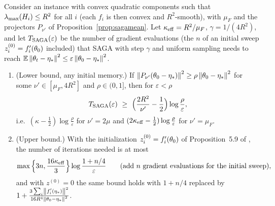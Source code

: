 \begin{corollary}
\label{cor:saga}
Consider an instance with convex quadratic components such that $\lambda_{\max}(H_i)\le R^2$ for all $i$ (each $f_i$ is then convex and $R^2$-smooth), with $\mu_F$ and the projectors $P_{\nu'}$ of Proposition~\ref{prop:sagamean}. Let $\kappa_{\rm eff}=R^2/\mu_F$, $\gamma=1/(4R^2)$, and let $T_{\rm SAGA}(\varepsilon)$ be the number of gradient evaluations (the $n$ of an initial sweep $z_i^{(0)}=f'_i(\theta_0)$ included) that SAGA with step $\gamma$ and uniform sampling needs to reach $\mathbb{E}\left\|\theta_t-\eta_\ast\right\|^2\le\varepsilon\left\|\theta_0-\eta_\ast\right\|^2$.
\begin{enumerate}[nosep,label=(\alph*)]
\item (Lower bound, any initial memory.) If $\left\|P_{\nu'}(\theta_0-\eta_\ast)\right\|^2\ge\rho\left\|\theta_0-\eta_\ast\right\|^2$ for some $\nu'\in[\mu_F,4R^2]$ and $\rho\in(0,1]$, then for $\varepsilon<\rho$
\[
T_{\rm SAGA}(\varepsilon)\ \ge\ \Big(\frac{2R^2}{\nu'}-\frac12\Big)\log\frac\rho\varepsilon ,
\]
i.e.\ $(\kappa-\frac12)\log\frac\rho\varepsilon$ for $\nu'=2\mu$ and $(2\kappa_{\rm eff}-\frac12)\log\frac\rho\varepsilon$ for $\nu'=\mu_F$.
\item (Upper bound.) With the initialization $z_i^{(0)}=f'_i(\theta_0)$ of Proposition~5.9 of \cite{bach2024learning}, the number of iterations needed is at most
\[
\max\Big\{3n,\frac{16\kappa_{\rm eff}}3\Big\}\log\frac{1+n/4}{\varepsilon}\qquad(\text{add $n$ gradient evaluations for the initial sweep}),
\]
and with $z^{(0)}=0$ the same bound holds with $1+n/4$ replaced by $1+\frac{3\sum_i\left\|f'_i(\eta_\ast)\right\|^2}{16R^4\left\|\theta_0-\eta_\ast\right\|^2}$.
\end{enumerate}
\end{corollary}

